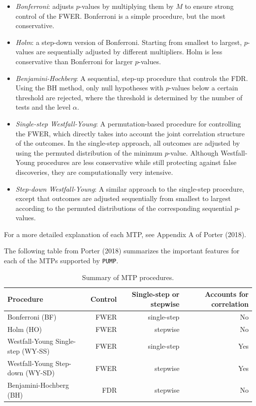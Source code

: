 \documentclass[
]{article}
\providecommand{\tightlist}{%
  \setlength{\itemsep}{0pt}\setlength{\parskip}{0pt}}
\begin{document}
\begin{itemize}
\tightlist
\item
  \emph{Bonferroni}: adjusts \(p\)-values by multiplying them by \(M\)
  to ensure strong control of the FWER. Bonferroni is a simple
  procedure, but the most conservative.
\item
  \emph{Holm}: a step-down version of Bonferroni. Starting from smallest
  to largest, \(p\)-values are sequentially adjusted by different
  multipliers. Holm is less conservative than Bonferroni for larger
  \(p\)-values.
\item
  \emph{Benjamini-Hochberg}: A sequential, step-up procedure that
  controls the FDR. Using the BH method, only null hypotheses with
  \(p\)-values below a certain threshold are rejected, where the
  threshold is determined by the number of tests and the level
  \(\alpha\).
\item
  \emph{Single-step Westfall-Young}: A permutation-based procedure for
  controlling the FWER, which directly takes into account the joint
  correlation structure of the outcomes. In the single-step approach,
  all outcomes are adjusted by using the permuted distribution of the
  minimum \(p\)-value. Although Westfall-Young procedures are less
  conservative while still protecting against false discoveries, they
  are computationally very intensive.
\item
  \emph{Step-down Westfall-Young}: A similar approach to the single-step
  procedure, except that outcomes are adjusted sequentially from
  smallest to largest according to the permuted distributions of the
  corresponding sequential \(p\)-values.
\end{itemize}

For a more detailed explanation of each MTP, see Appendix A of Porter
(2018).

The following table from Porter (2018) summarizes the important features
for each of the MTPs supported by \texttt{PUMP}.

\begin{table}[h!]
\centering
\begin{tabular}{l r r r}
\toprule
Procedure                             & Control & Single-step or stepwise & Accounts for correlation \\ \midrule
Bonferroni (BF)                       & FWER    & single-step             & No                       \\
Holm (HO)                             & FWER    & stepwise                & No\\
Westfall-Young Single-step (WY-SS)    & FWER    & single-step             & Yes\\
Westfall-Young Step-down (WY-SD)      & FWER    & stepwise                & Yes\\
Benjamini-Hochberg (BH)               & FDR     & stepwise                & No \\
\bottomrule
\end{tabular}
\caption{Summary of MTP procedures.}
  \label{tab:mtp}
\end{table}
\end{document}
